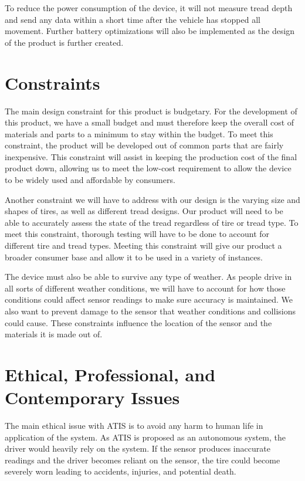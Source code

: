 \documentclass[11pt]{IEEEtran}
\begin{document}
			To reduce the power consumption of the device, it will not measure tread depth and send any data within a short time after the vehicle has stopped all movement. Further battery optimizations will also be implemented as the design of the product is further created. 


	\section{Constraints}
		The main design constraint for this product is budgetary. For the development of this product, we have a small budget and must therefore keep the overall cost of materials and parts to a minimum to stay within the budget. To meet this constraint, the product will be developed out of common parts that are fairly inexpensive. This constraint will assist in keeping the production cost of the final product down, allowing us to meet the low-cost requirement to allow the device to be widely used and affordable by consumers. 

		Another constraint we will have to address with our design is the varying size and shapes of tires, as well as different tread designs. Our product will need to be able to accurately assess the state of the tread regardless of tire or tread type. To meet this constraint, thorough testing will have to be done to account for different tire and tread types. Meeting this constraint will give our product a broader consumer base and allow it to be used in a variety of instances.

		The device must also be able to survive any type of weather. As people drive in all sorts of different weather conditions, we will have to account for how those conditions could affect sensor readings to make sure accuracy is maintained. We also want to prevent damage to the sensor that weather conditions and collisions could cause.  These constraints influence the location of the sensor and the materials it is made out of.

	\section{Ethical, Professional, and Contemporary Issues}
		The main ethical issue with ATIS is to avoid any harm to human life in application of the system. As ATIS is proposed as an autonomous system, the driver would heavily rely on the system. If the sensor produces inaccurate readings and the driver becomes reliant on the sensor, the tire could become severely worn leading to accidents, injuries, and potential death. 
\end{document}
